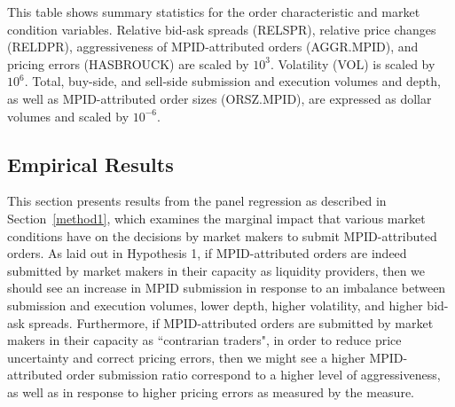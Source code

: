 \documentclass{article}
\begin{document}
\begin{table}[htp!]
\begin{center}
{\begin{tabular}{lp{1.5cm}p{1.5cm}p{1.5cm}p{1.5cm}p{1.5cm}p{1.5cm}p{1.5cm}}
\\
\hline \hline
\end{tabular}}
\begin{minipage}{0.75\textwidth}
\footnotesize
This table shows summary statistics for the order characteristic and market condition variables. Relative bid-ask spreads (RELSPR), relative price changes (RELDPR), aggressiveness of MPID-attributed orders (AGGR.MPID), and pricing errors (HASBROUCK) are scaled by $10^3$. Volatility (VOL) is scaled by $10^6$. Total, buy-side, and sell-side submission and execution volumes and depth, as well as MPID-attributed order sizes (ORSZ.MPID), are expressed as dollar volumes and scaled by $10^{-6}$.
\end{minipage}
\end{center}
\end{table}

\subsection{Empirical Results}\label{results1}

This section presents results from the panel regression as described in Section~\ref{method1}, which examines the marginal impact that various market conditions have on the decisions by market makers to submit MPID-attributed orders. As laid out in Hypothesis 1, if MPID-attributed orders are indeed submitted by market makers in their capacity as liquidity providers, then we should see an increase in MPID submission in response to an imbalance between submission and execution volumes, lower depth, higher volatility, and higher bid-ask spreads. Furthermore, if MPID-attributed orders are submitted by market makers in their capacity as ``contrarian traders", in order to reduce price uncertainty and correct pricing errors, then we might see a higher MPID-attributed order submission ratio correspond to a higher level of aggressiveness, as well as in response to higher pricing errors as measured by the \citet{hasbrouck1993assessing} measure.
\end{document}
